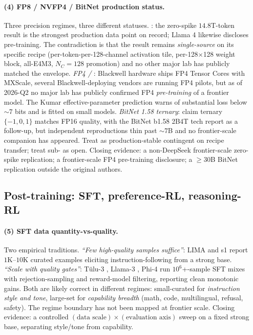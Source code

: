 \paragraph{(4) FP8 / NVFP4 / BitNet production status.}
Three precision regimes, three different statuses. \emph{}: the
 zero-spike $14.8$T-token result \citep[abstract]{deepseek-v3}
is the strongest production data point on record; Llama 4
\citep{meta-llama4} likewise discloses  pre-training. The
contradiction is that the  result remains \emph{single-source} on
its specific recipe (per-token-per-128-channel activation tile,
per-128$\times$128 weight block, all-E4M3, $N_C = 128$ promotion)
and no other major lab has publicly matched the envelope. \emph{FP4
/ }: Blackwell hardware ships FP4 Tensor Cores with MXScale,
several Blackwell-deploying vendors are running FP4 pilots, but as
of 2026-Q2 no major lab has publicly confirmed FP4 \emph{pre-training}
of a frontier model. The Kumar effective-parameter prediction warns
of substantial loss below $\sim$$7$ bits and is fitted on small
models. \emph{BitNet 1.58 ternary}: \citet{ma2024-bitnet} claim
ternary $\{-1, 0, 1\}$ matches FP16 quality, with the BitNet b1.58
2B4T tech report \citep{bitnet-2b4t-2025} as a follow-up, but
independent reproductions thin past $\sim$$7$B  and no
frontier-scale companion has appeared. Treat  as
production-stable contingent on recipe transfer; treat sub- as
open. Closing evidence: a non-DeepSeek frontier-scale 
zero-spike replication; a frontier-scale FP4 pre-training
disclosure; a $\geq$$30$B BitNet replication outside the original
authors.

\subsection{Post-training: SFT, preference-RL, reasoning-RL}
\label{sec:contradictions-post}

\paragraph{(5) SFT data quantity-vs-quality.}
Two empirical traditions. \emph{``Few high-quality samples
suffice''}:
LIMA and s1 \citep{s1-2025} report $1$K--$10$K curated
examples eliciting instruction-following from a strong base.
\emph{``Scale with quality gates''}: T\"ulu-3 \citep{tulu3}, Llama-3
\citep{meta-llama3}, Phi-4 \citep{phi4} run $10^6$+-sample SFT mixes
with rejection-sampling and reward-model filtering, reporting clean
monotonic gains. Both are likely correct in different regimes:
small-curated for \emph{instruction style and tone}, large-set for
\emph{capability breadth} (math, code, multilingual, refusal,
safety). The regime boundary has not been mapped at frontier scale.
Closing evidence: a controlled
$(\text{data scale}) \times (\text{evaluation axis})$ sweep on a
fixed strong base, separating style/tone from capability.

